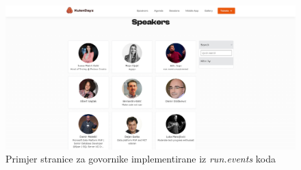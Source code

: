 		\begin{figure}
			\centering
			\includegraphics[width=1\linewidth]{slike/kulen-speakers.png}
			\caption{Primjer stranice za govornike implementirane iz \textit{run.events} koda}
			\label{fig:kulen-speakers}
		\end{figure}
		
		\eject
		
		
		
	